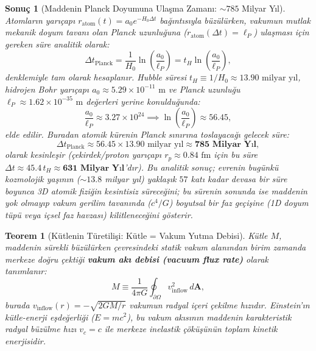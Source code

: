 \documentclass[11pt,a4paper]{article}
\newtheorem{theorem}{Teorem}[section]
\newtheorem{corollary}{Sonuç}[theorem]
\begin{document}
\begin{corollary}[Maddenin Planck Doyumuna Ulaşma Zamanı: $\sim 785$ Milyar Yıl]
    \label{cor:planck_boyuna_inme_zamani_sc}
    Atomların yarıçapı $r_{\mathrm{atom}}(t) = a_0 e^{-H_0 \Delta t}$ bağıntısıyla büzülürken, vakumun mutlak mekanik doyum tavanı olan Planck uzunluğuna ($r_{\mathrm{atom}}(\Delta t) = \ell_P$) ulaşması için gereken süre analitik olarak:
    \begin{equation}
        \Delta t_{\mathrm{Planck}} = \frac{1}{H_0} \ln\left( \frac{a_0}{\ell_P} \right) = t_H \ln\left( \frac{a_0}{\ell_P} \right),
        \label{eq:planck_zamani_hesap_sc}
    \end{equation}
    denklemiyle tam olarak hesaplanır. Hubble süresi $t_H \equiv 1/H_0 \approx 13.90\text{ milyar yıl}$, hidrojen Bohr yarıçapı $a_0 \approx 5.29 \times 10^{-11}\text{ m}$ ve Planck uzunluğu $\ell_P \approx 1.62 \times 10^{-35}\text{ m}$ değerleri yerine konulduğunda:
    \begin{equation}
        \frac{a_0}{\ell_P} \approx 3.27 \times 10^{24} \implies \ln\left( \frac{a_0}{\ell_P} \right) \approx 56.45,
    \end{equation}
    elde edilir. Buradan atomik kürenin Planck sınırına toslayacağı gelecek süre:
    \begin{equation}
        \Delta t_{\mathrm{Planck}} \approx 56.45 \times 13.90\text{ milyar yıl} \approx \mathbf{785\text{ Milyar Yıl}},
        \label{eq:785_milyar_yil_sc}
    \end{equation}
    olarak kesinleşir (çekirdek/proton yarıçapı $r_p \approx 0.84\text{ fm}$ için bu süre $\Delta t \approx 45.4 \, t_H \approx \mathbf{631\text{ Milyar Yıl}}$'dır). Bu analitik sonuç; evrenin bugünkü kozmolojik yaşının ($\sim 13.8$ milyar yıl) yaklaşık $57$ katı kadar devasa bir süre boyunca 3D atomik fiziğin kesintisiz süreceğini; bu sürenin sonunda ise maddenin yok olmayıp vakum gerilim tavanında ($c^4/G$) boyutsal bir faz geçişine (1D doyum tüpü veya içsel faz havzası) kilitleneceğini gösterir.
\end{corollary}

\begin{theorem}[Kütlenin Türetilişi: Kütle = Vakum Yutma Debisi]
    \label{thm:kutle_turetilis}
    Kütle $M$, maddenin sürekli büzülürken çevresindeki statik vakum alanından birim zamanda merkeze doğru çektiği \textbf{vakum akı debisi (vacuum flux rate)} olarak tanımlanır:
    \begin{equation}
        M \equiv \frac{1}{4\pi G} \oint_{\partial \Omega} v_{\mathrm{inflow}}^2 \, d\mathbf{A},
        \label{eq:kutle_tanim}
    \end{equation}
    burada $v_{\mathrm{inflow}}(r) = -\sqrt{2GM/r}$ vakumun radyal içeri çekilme hızıdır. Einstein'ın kütle-enerji eşdeğerliği ($E = mc^2$), bu vakum akısının maddenin karakteristik radyal büzülme hızı $v_c = c$ ile merkeze inelastik çöküşünün toplam kinetik enerjisidir.
\end{theorem}
\end{document}
